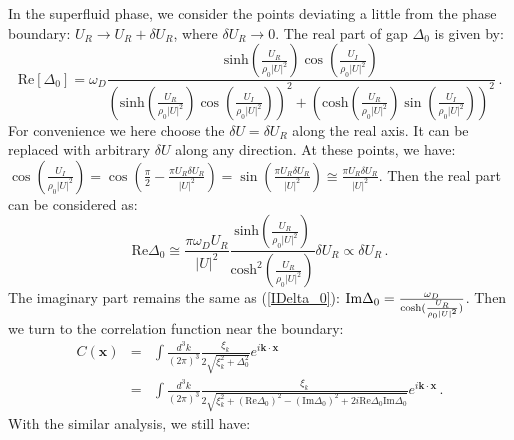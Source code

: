 \documentclass[aps,onecolumn,nofootinbib,superscriptaddress,notitlepage,longbibliography]{revtex4-1}
\begin{document}
In the superfluid phase, we consider the points deviating a little
from the phase boundary: $U_{R}\rightarrow U_{R}+\delta U_{R}$, where
$\delta U_{R}\rightarrow0$. The real part of gap $\Delta_{0}$ is
given by: 
\begin{equation}
\text{Re}[\Delta_{0}]=\omega_{D}\frac{\text{sinh}\left(\frac{U_{R}}{\rho_{0}|U|^{2}}\right)\cos\left(\frac{U_{I}}{\rho_{0}|U|^{2}}\right)}{\left(\text{sinh}\left(\frac{U_{R}}{\rho_{0}|U|^{2}}\right)\cos\left(\frac{U_{I}}{\rho_{0}|U|^{2}}\right)\right)^{2}+\left(\text{cosh}\left(\frac{U_{R}}{\rho_{0}|U|^{2}}\right)\sin\left(\frac{U_{I}}{\rho_{0}|U|^{2}}\right)\right)^{2}}\,.
\end{equation}
For convenience we here choose the $\delta U=\delta U_{R}$ along
the real axis. It can be replaced with arbitrary $\delta U$ along
any direction. At these points, we have: $\cos\left(\frac{U_{I}}{\rho_{0}|U|^{2}}\right)=\cos\left(\frac{\pi}{2}-\frac{\pi U_{R}\delta U_{R}}{|U|^{2}}\right)=\sin\left(\frac{\pi U_{R}\delta U_{R}}{|U|^{2}}\right)\cong\frac{\pi U_{R}\delta U_{R}}{|U|^{2}}$.
Then the real part can be considered as: 
\begin{equation}
\text{Re}\Delta_{0}\cong\frac{\pi\omega_{D}U_{R}}{|U|^{2}}\frac{\text{sinh}\left(\frac{U_{R}}{\rho_{0}|U|^{2}}\right)}{\text{cosh}^{2}\left(\frac{U_{R}}{\rho_{0}|U|^{2}}\right)}\delta U_{R}\propto\delta U_{R}\,.
\end{equation}
The imaginary part remains the same as (\ref{IDelta_0}): $\text{Im}\Delta_{0}=\frac{\omega_{D}}{\text{cosh(\ensuremath{\frac{U_{R}}{\rho_{0}|U|^{2}}})}}$.
Then we turn to the correlation function near the boundary: 
\begin{eqnarray}
C(\bm{x}) & = & \int\frac{d^{3}k}{(2\pi)^{3}}\frac{\xi_{k}}{2\sqrt{\xi_{k}^{2}+\Delta_{0}^{2}}}e^{i\bm{k}\cdot\bm{x}}\nonumber \\
 & = & \int\frac{d^{3}k}{(2\pi)^{3}}\frac{\xi_{k}}{2\sqrt{\xi_{k}^{2}+\left(\text{Re}\Delta_{0}\right)^{2}-\left(\text{Im}\Delta_{0}\right)^{2}+2i\text{Re}\Delta_{0}\text{Im}\Delta_{0}}}e^{i\bm{k}\cdot\bm{x}}\,.
\end{eqnarray}
With the similar analysis, we still have: 
\end{document}

